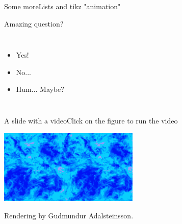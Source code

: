 \documentclass[t,10pt,xcolor={dvipsnames}]{beamer}
\newcommand{\Direction}{\hat{\vec{z}}}
\newcommand{\SwimmingDirection}{\hat{\vec{p}}}
\begin{document}

\begin{frame}{Some more}{Lists and tikz "animation"}
	\vspace{10pt}
	\begin{center}
		Amazing question?
		\vspace{10pt}
		\begin{columns}[c]
			\begin{itemize}
				\item<1-> Yes!
				\item<2-> No...
				\item<3-> Hum... Maybe?
			\end{itemize}

		\end{columns}
	\end{center}
\end{frame}


\begin{frame}{A slide with a video}{Click on the figure to run the video}
	\vspace{60pt}
	\centering

	\href{run:videos/jhtdb.mp4}{\includegraphics[width=0.5\textwidth]{images/jhtdb.pdf}}
			
	\scriptsize Rendering by Gudmundur Adalsteinsson.
\end{frame}
\end{document}
